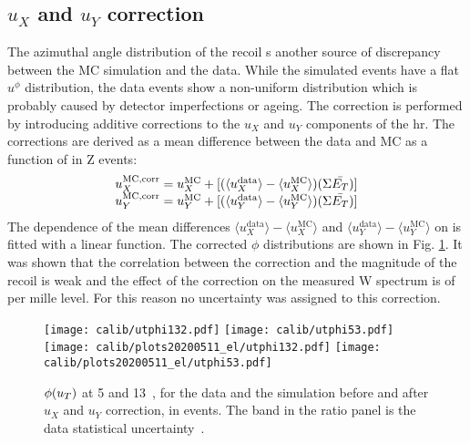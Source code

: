      \subsection{$u_X$ and $u_Y$ correction}
     The azimuthal angle distribution of the recoil s another source of discrepancy between the MC simulation and the data. While the simulated events have a flat $u^{\phi}$ distribution, the data events show a non-uniform distribution which is probably caused by detector imperfections or ageing. The correction is performed by introducing additive corrections to the $u_X$ and $u_Y$ components of the \gls{hr}. The corrections are derived as a mean difference between the data and MC as a function of \setue in Z events:
     \begin{equation}
     \begin{array}{c}
     u_X^{\mathrm{MC, corr}} = u_X^{\mathrm{MC}} + [(\langle{u_X^{\mathrm{data}}}\rangle-\langle{u_X^{\mathrm{MC}}}\rangle)(\Sigma \bar{E_T} )] \\
     u_Y^{\mathrm{MC, corr}} = u_Y^{\mathrm{MC}} + [(\langle{u_Y^{\mathrm{data}}}\rangle-\langle{u_Y^{\mathrm{MC}}}\rangle)(\Sigma \bar{E_T} )]
     \end{array}
     \end{equation}
     The dependence of the mean differences $\langle{u_X^{\mathrm{data}}}\rangle-\langle{u_X^{\mathrm{MC}}}\rangle$ and $\langle{u_Y^{\mathrm{data}}}\rangle-\langle{u_Y^{\mathrm{MC}}}\rangle$ on \setue is fitted with a linear function. The corrected $\phi$ distributions are shown in Fig. \ref{fig:utphicorr}. It was shown that the correlation between the correction and the magnitude of the recoil is weak and the effect of the correction on the measured W spectrum is of per mille level. For this reason no uncertainty was assigned to this correction.
     
     \begin{figure}
     		\texttt{[image: calib/utphi132.pdf]}
     		\texttt{[image: calib/utphi53.pdf]}
     		\texttt{[image: calib/plots20200511\_el/utphi132.pdf]}
     		\texttt{[image: calib/plots20200511\_el/utphi53.pdf]}
     	\caption{$\phi(u_{T})$ at 5 and 13~\TeV, for the data and the simulation before and after $u_X$ and $u_Y$ correction, in \Zboson events. The band in the ratio panel is the data statistical uncertainty~\cite{int_note_hr}.}
     	\label{fig:utphicorr}
     \end{figure}
     
